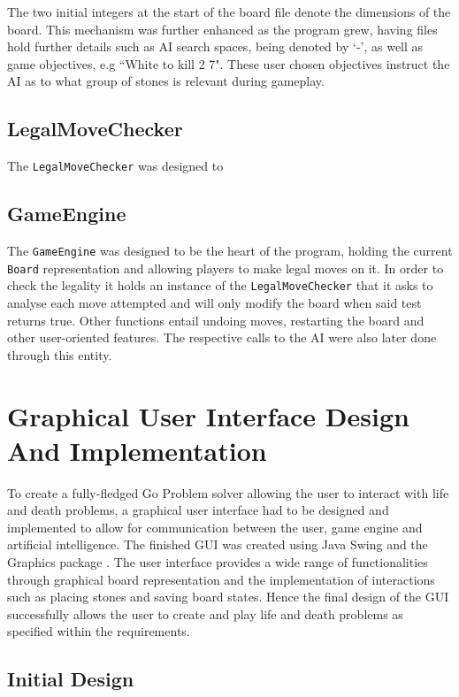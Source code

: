 \documentclass{l3proj}
\begin{document}
The two initial integers at the start of the board file denote the dimensions of the board. This mechanism was further enhanced as the program grew, having files hold further details such as AI search spaces, being denoted by `-', as well as game objectives, e.g ``White to kill 2 7". These user chosen objectives instruct the AI as to what group of stones is relevant during gameplay. 

\subsection{LegalMoveChecker}
The \texttt{LegalMoveChecker} was designed to 

\subsection{GameEngine}

The \texttt{GameEngine} was designed to be the heart of the program, holding the current \texttt{Board} representation and allowing players to make legal moves on it. In order to check the legality it holds an instance of the \texttt{LegalMoveChecker} that it asks to analyse each move attempted and will only modify the board when said test returns true. Other functions entail undoing moves, restarting the board and other user-oriented features. The respective calls to the AI were also later done through this entity.

\section{Graphical User Interface Design And Implementation}

To create a fully-fledged Go Problem solver allowing the user to interact with life and death problems, a graphical user interface had to be designed and implemented to allow for communication between the user, game engine and artificial intelligence. The finished GUI was created using Java Swing \cite{Swing} and the Graphics package \cite{Graphics}. The user interface provides a wide range of functionalities through graphical board representation and the implementation of interactions such as placing stones and saving board states. Hence the final design of the GUI successfully allows the user to create and play life and death problems as specified within the requirements.

\subsection{Initial Design}
\end{document}
